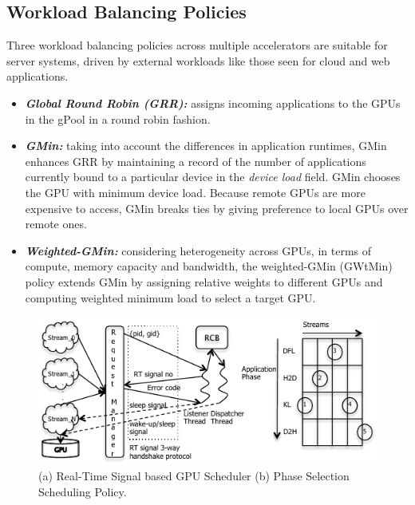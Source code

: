 \subsection{Workload Balancing Policies }
Three workload balancing policies across multiple accelerators are suitable for server systems, driven by external workloads like those seen for cloud and web applications.
\begin{itemize}
\item \textbf{\textit{Global Round Robin (GRR): }}assigns incoming applications to the GPUs in the gPool in a round robin fashion.
\item \textbf{\textit{GMin: }} taking into account the differences in application runtimes, GMin enhances GRR by maintaining a record of the number of applications currently bound to a particular device in the \textit{device load} field. GMin chooses the GPU with minimum device load. Because remote GPUs are more expensive to access, GMin breaks ties by giving preference to local GPUs over remote ones.
\item \textbf{\textit{Weighted-GMin: }}considering heterogeneity across GPUs, in terms of compute, memory capacity and bandwidth, the weighted-GMin (GWtMin) policy extends GMin by assigning relative weights to different GPUs and computing weighted minimum load to select a target GPU.
\end{itemize}
\begin{figure}[!t]
\centering
\includegraphics[width=\textwidth,height=\textheight,keepaspectratio]{figures/RT_sched.pdf}
\caption{(a) Real-Time Signal based GPU Scheduler (b) Phase Selection Scheduling Policy. }
\label{fig:RT_sched}
\end{figure}
